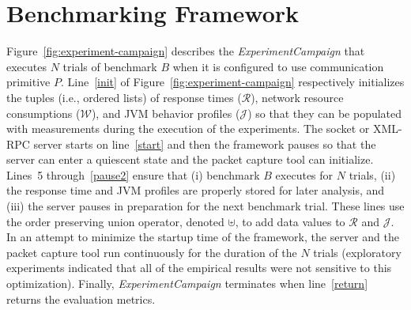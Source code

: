 \documentclass{sig-alternate}
\begin{document}

\vspace*{-.1in}

\section{Benchmarking Framework}
\label{sec:benchmark-framework}



Figure~\ref{fig:experiment-campaign} describes the {\em
  ExperimentCampaign} that executes $N$ trials of benchmark $B$ when
it is configured to use communication primitive $P$. Line~\ref{init}
of Figure~\ref{fig:experiment-campaign} respectively initializes the
tuples (i.e., ordered lists) of response times ($\mathcal{R}$),
network resource consumptions ($\mathcal{W}$), and JVM behavior
profiles ($\mathcal{J}$) so that they can be populated with
measurements during the execution of the experiments.  The socket or
XML-RPC server starts on line~\ref{start} and then the framework
pauses so that the server can enter a quiescent state and the packet
capture tool can initialize.  Lines~5 through~\ref{pause2} ensure that
(i) benchmark $B$ executes for $N$ trials, (ii) the response time and
JVM profiles are properly stored for later analysis, and (iii) the
server pauses in preparation for the next benchmark trial.  These
lines use the order preserving union operator, denoted $\uplus$, to
add data values to $\mathcal{R}$ and $\mathcal{J}$.  In an attempt to
minimize the startup time of the framework, the server and the packet
capture tool run continuously for the duration of the $N$ trials
(exploratory experiments indicated that all of the empirical results
were not sensitive to this optimization).  Finally, {\em
  ExperimentCampaign} terminates when line~\ref{return} returns the
evaluation metrics.
\end{document}
